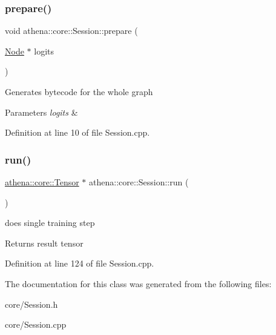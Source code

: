 \subsubsection{\texorpdfstring{prepare()}{prepare()}}
{\footnotesize\ttfamily void athena\+::core\+::\+Session\+::prepare (\begin{DoxyParamCaption}\item[{\mbox{\hyperlink{classathena_1_1core_1_1_node}{Node}} $\ast$}]{logits }\end{DoxyParamCaption})}

Generates bytecode for the whole graph 
\begin{DoxyParams}{Parameters}
{\em logits} & \\
\hline
\end{DoxyParams}


Definition at line 10 of file Session.\+cpp.

\mbox{\label{classathena_1_1core_1_1_session_ab08af50ae0bbd2ed5171e1f45a7680ff}} 
\subsubsection{\texorpdfstring{run()}{run()}}
{\footnotesize\ttfamily \mbox{\hyperlink{classathena_1_1core_1_1_tensor}{athena\+::core\+::\+Tensor}} $\ast$ athena\+::core\+::\+Session\+::run (\begin{DoxyParamCaption}{ }\end{DoxyParamCaption})}

does single training step \begin{DoxyReturn}{Returns}
result tensor 
\end{DoxyReturn}


Definition at line 124 of file Session.\+cpp.



The documentation for this class was generated from the following files\+:\begin{DoxyCompactItemize}
\item 
core/Session.\+h\item 
core/Session.\+cpp\end{DoxyCompactItemize}
